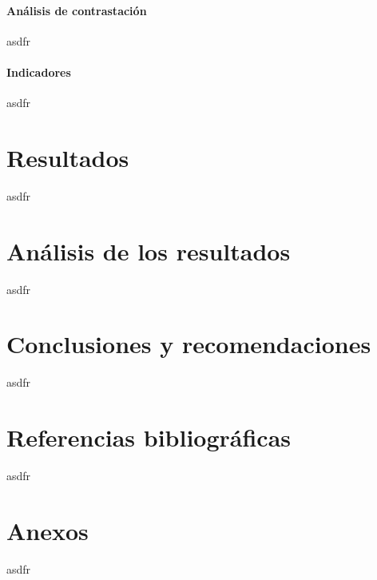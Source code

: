 \documentclass{report}
\begin{document}
\subsubsection{Análisis de contrastación}
asdfr
\subsubsection{Indicadores}
asdfr
\chapter{Resultados}
asdfr
\chapter{Análisis de los resultados}
asdfr
\chapter{Conclusiones y recomendaciones}
asdfr
\chapter{Referencias bibliográficas}
asdfr
\chapter{Anexos}
asdfr
\end{document}
